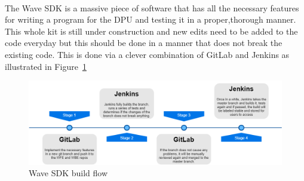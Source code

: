 \paragraph{}
The Wave SDK is a massive piece of software that has all the necessary features for writing a program for the DPU and testing it in a proper,thorough manner. This whole kit is still under construction and new edits need to be added to the code everyday but this should be done in a manner that does not break the existing code. This is done via a clever combination of GitLab and Jenkins as illustrated in Figure~\ref{Fig:build}

\begin{figure}[H]
    \centering  
    \includegraphics[trim=0cm 0cm 0cm 0cm, clip=true,scale=0.4]{figures/build.png}
    \caption{Wave SDK build flow\label{Fig:build}}\vspace{-4mm}
    \end{figure}